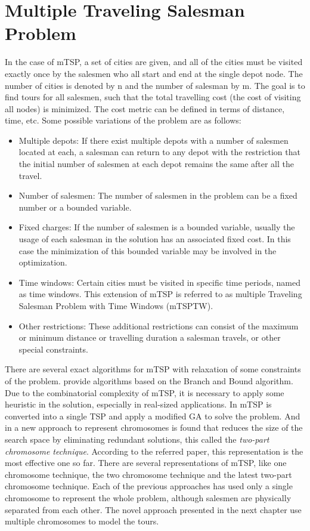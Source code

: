 \documentclass[11pt]{article}
\begin{document}
\section{Multiple Traveling Salesman Problem}
In the case of mTSP, a set of cities are given, and all of the cities must be visited exactly once by the salesmen who all start and end at the single depot node. The number of cities is denoted by n and the number of salesman by m.
The goal is to find tours for all salesmen, such that the total travelling cost (the cost of
visiting all nodes) is minimized. The cost metric can be defined in terms of distance,
time, etc. Some possible variations of the problem are as follows: 
\begin{itemize}
\item Multiple depots: If there exist multiple depots with a number of salesmen located
at each, a salesman can return to any depot with the restriction that the initial number of salesmen at each depot remains the same after all the travel. 
\item Number of salesmen: The number of salesmen in the problem can be a fixed number or a bounded variable. 
\item Fixed charges: If the number of salesmen is a bounded variable, usually the usage
of each salesman in the solution has an associated fixed cost. In this case the minimization of this bounded variable may be involved in the optimization.
\item Time windows: Certain cities must be visited in specific time periods, named as
time windows. This extension of mTSP is referred to as multiple Traveling Salesman Problem with Time Windows (mTSPTW).
\item Other restrictions: These additional restrictions can consist of the maximum or
minimum distance or travelling duration a salesman travels, or other special
constraints. 
\end{itemize}
There are several exact algorithms for mTSP with relaxation of some constraints of the problem. \cite{cuttingmtps, bbmtsp} provide algorithms based on the Branch and Bound algorithm. Due to the combinatorial complexity of mTSP, it is necessary to apply some heuristic in the solution, especially in real-sized applications. In \cite{nn} mTSP is converted into a single TSP and apply a modified GA to solve the problem. And in \cite{twopart} a new approach to represent chromosomes is found that reduces the size of the search space by eliminating redundant solutions, this called the \textit{two-part chromosome technique}. According to the referred paper, this representation is the most effective one so far. There are several representations of mTSP, like one chromosome technique, the two chromosome technique and the latest two-part chromosome technique. Each of the previous approaches has used only a single chromosome to represent the whole problem, although salesmen are physically separated from each other.
The novel approach presented in the next chapter use multiple chromosomes to model the tours. 
\newpage
\end{document}
